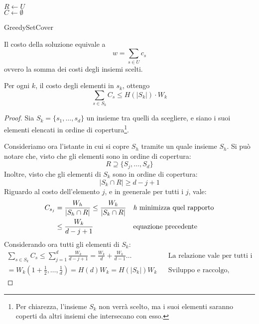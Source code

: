 \begin{algorithm}[H]
    \SetAlgoLined
     $R \gets U$\\
     $C \gets \emptyset$\\
     \caption{GreedySetCover}
\end{algorithm}

\begin{remark}
    \label{oss1set}
    Il costo della soluzione equivale a $$w = \sum_{s\in U}c_s$$ ovvero la somma dei costi 
    degli insiemi scelti.
\end{remark}
\begin{remark}
    \label{oss2set}
    Per ogni $k$, il costo degli elementi in $s_k$, ottengo 
    $$\sum_{s \in S_k}C_s \leq H(|S_k|) \cdot  W_k$$
\end{remark}
\begin{proof}
    Sia $S_k = \{s_1, \dots, s_d\}$ un insieme tra quelli da scegliere, e siano 
    i suoi elementi elencati in ordine di copertura\footnote{Per chiarezza, l'insieme $S_k$ non verrà scelto, 
    ma i suoi elementi saranno coperti da altri insiemi che intersecano con esso.}.

    Consideriamo ora l'istante in cui si copre $S_h$ tramite un quale insieme $S_h$.
    Si può notare che, visto che gli elementi sono in ordine di copertura: 
    $$R \supseteq \{S_j, \dots, S_d \}$$
    Inoltre, visto che gli elementi di $S_k$ sono in ordine di copertura: 
    $$|S_k \cap R| \geq d-j+1$$
    Riguardo al costo dell'elemento $j$, e in geenerale per tutti i $j$, vale:
    \begin{equation}
        \begin{aligned}
            C_{s_j} &= \frac{W_h}{|S_h \cap R|} \leq \frac{W_k}{|S_k \cap R|} && \text{\emph{h} minimizza quel rapporto}\\
            &\leq \frac{W_k}{d-j+1} && \text{equazione precedente}\\
        \end{aligned}
    \end{equation}
    Considerando ora tutti gli elementi di $S_k$: 
    \begin{equation}
        \begin{aligned}
            \sum_{s\in S_k} C_s \leq \sum_{j=1}^{d}\frac{W_k}{d-j+1} = \frac{W_k}{d} + \frac{W_k}{d-1} \dots && \text{La relazione vale per tutti i j}\\
            = W_k(1 + \frac{1}{2}, \dots, \frac{1}{d}) = H(d)W_k = H(|S_k|)W_k && \text{Sviluppo e raccolgo, ottengo l'oss.}
        \end{aligned}
    \end{equation}
\end{proof}
